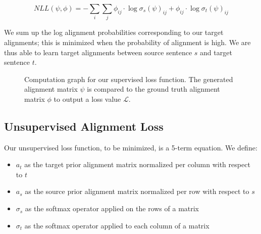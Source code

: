 \documentclass[twoside,twocolumn]{article}
\begin{document}
\begin{equation}
  NLL(\psi, \phi) = - \sum_i \sum_j  \phi_{ij} \cdot \log \sigma_s (\psi)_{ij} + \phi_{ij} \cdot \log \sigma_t (\psi)_{ij}
\end{equation}

We sum up the log alignment probabilities corresponding to our target
alignments; this is minimized when the probability of alignment is high. We
are thus able to learn target alignments between source sentence $s$ and target
sentence $t$.

\begin{figure}
  \centering
  \caption{Computation graph for our supervised loss function.
    The generated alignment matrix $\psi$ is compared to the ground
    truth alignment matrix $\phi$ to output a loss value $\mathcal{L}$.}
  \label{fig:supervised_loss}
\end{figure}

\subsection{Unsupervised Alignment Loss}


Our unsupervised loss function, to be minimized, is a 5-term equation.
We define:
\begin{itemize}[label={}]
  \item $a_t$ as the target prior alignment matrix normalized per column with respect to $t$\\ %
  \item $a_s$ as the source prior alignment matrix normalized per row with respect to $s$\\ %
  \item $\sigma_s$ as the softmax operator applied on the rows of a matrix\\
  \item $\sigma_t$ as the softmax operator applied to each column of a matrix
\end{itemize}
\end{document}
